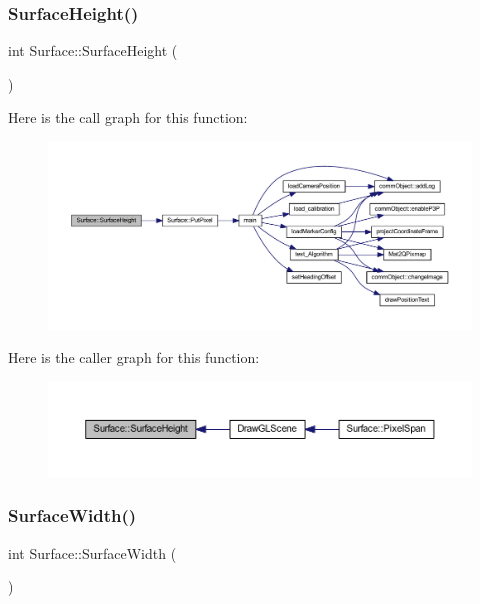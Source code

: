\subsubsection{\texorpdfstring{Surface\+Height()}{SurfaceHeight()}}
{\footnotesize\ttfamily int Surface\+::\+Surface\+Height (\begin{DoxyParamCaption}{ }\end{DoxyParamCaption})\hspace{0.3cm}{\ttfamily [inline]}}

Here is the call graph for this function\+:\nopagebreak
\begin{figure}[H]
\begin{center}
\leavevmode
\includegraphics[width=350pt]{class_surface_a377c59f6ef131d4b879cda93578a3efa_cgraph}
\end{center}
\end{figure}
Here is the caller graph for this function\+:\nopagebreak
\begin{figure}[H]
\begin{center}
\leavevmode
\includegraphics[width=350pt]{class_surface_a377c59f6ef131d4b879cda93578a3efa_icgraph}
\end{center}
\end{figure}
\mbox{\label{class_surface_a4cbf23ea0c8ff533271109fc2a1a863d}} 
\subsubsection{\texorpdfstring{Surface\+Width()}{SurfaceWidth()}}
{\footnotesize\ttfamily int Surface\+::\+Surface\+Width (\begin{DoxyParamCaption}{ }\end{DoxyParamCaption})\hspace{0.3cm}{\ttfamily [inline]}}

